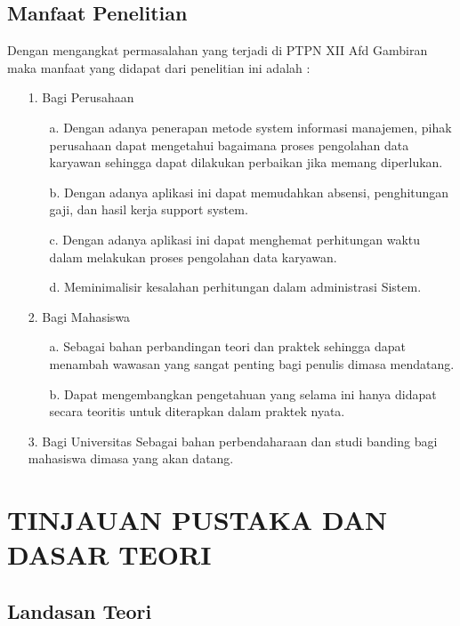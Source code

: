 \documentclass{jtetiproposalskripsi}
\begin{document}
\section{Manfaat Penelitian}
Dengan mengangkat permasalahan yang terjadi di PTPN XII Afd Gambiran maka manfaat yang didapat dari penelitian ini adalah :
\begin{itemize}
\item[1.] Bagi Perusahaan 
\begin{itemize}
\item[a.] Dengan adanya penerapan metode system informasi manajemen, pihak perusahaan dapat mengetahui bagaimana proses pengolahan data karyawan sehingga dapat dilakukan perbaikan jika memang diperlukan.
\item[b.] Dengan adanya aplikasi ini dapat memudahkan absensi, penghitungan gaji, dan hasil kerja support system.
\item[c.] Dengan adanya aplikasi ini dapat menghemat perhitungan waktu dalam melakukan proses pengolahan data karyawan.
\item[d.] Meminimalisir kesalahan perhitungan dalam administrasi Sistem.
\end{itemize}
\item[2.] Bagi Mahasiswa 
\begin{itemize}
\item[a.] Sebagai bahan perbandingan teori dan praktek sehingga dapat menambah wawasan yang sangat penting bagi penulis dimasa mendatang. 
\item[b.] Dapat mengembangkan pengetahuan yang selama ini hanya didapat secara teoritis untuk diterapkan dalam praktek nyata. 
\end{itemize} 
\item[3.] Bagi Universitas  
Sebagai bahan perbendaharaan dan studi banding bagi mahasiswa dimasa yang akan datang.
\end{itemize}

\chapter{TINJAUAN PUSTAKA DAN DASAR TEORI}               
\section{Landasan Teori}
\end{document}
